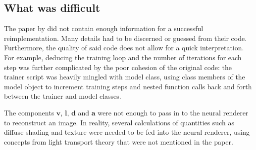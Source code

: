 \subsection{What was difficult}

The paper by \cite{gan2shape} did not contain enough information for a successful reimplementation. Many details had to be discerned or guessed from their code. Furthermore, the quality of said code does not allow for a quick interpretation. For example, deducing the training loop and the number of iterations for each step was further complicated by the poor cohesion of the original code: the trainer script was heavily mingled with model class, using class members of the model object to increment training steps and nested function calls back and forth between the trainer and model classes. 

The components  $\mathbf{v}$, $\mathbf{l}$, $\mathbf{d}$ and  $\mathbf{a}$ were not enough to pass in to the neural renderer to reconstruct an image. In reality, several calculations of quantities such as diffuse shading and texture were needed to be fed into the neural renderer, using concepts from light transport theory that were not mentioned in the paper.


